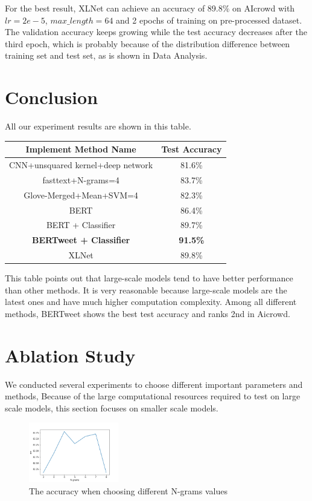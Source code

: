\documentclass[journal]{IEEEtran}
\begin{document}
For the best result, XLNet can achieve an accuracy of 89.8\% on AIcrowd with $lr = 2e-5$, $max\_length = 64$ and 2 epochs of training on pre-processed dataset. The validation accuracy keeps growing while the test accuracy decreases after the third epoch, which is probably because of the distribution difference between training set and test set, as is shown in Data Analysis.

\section{Conclusion}
All our experiment results are shown in this table.

\begin{center}
    \begin{tabular}{c c}
    \hline
    Implement Method Name& Test Accuracy\\
    \hline
    CNN+unsquared kernel+deep network& 81.6\%\\
    fasttext+N-grams=4& 83.7\%\\
    Glove-Merged+Mean+SVM=4& 82.3\%\\
    BERT&  86.4\%\\
    BERT + Classifier&  89.7\%\\
    \textbf{BERTweet + Classifier}&  \textbf{91.5\%}\\
    XLNet& 89.8\%\\
    \hline
    \end{tabular}
\end{center}
This table points out that large-scale models tend to have better performance than other methods. It is very reasonable because large-scale models are the latest ones and have much higher computation complexity. Among all different methods, BERTweet shows the best test accuracy and ranks 2nd in Aicrowd.


\section{Ablation Study} We conducted several experiments to choose different important parameters and methods, Because of the large computational resources required to test on large scale models, this section focuses on smaller scale models.
\begin{figure}[h]
    \centering
        \includegraphics[width=0.35\textwidth]{N-grams.png}
    \caption{\label{N-grams}The accuracy when choosing different N-grams values}
\end{figure}
\end{document}
